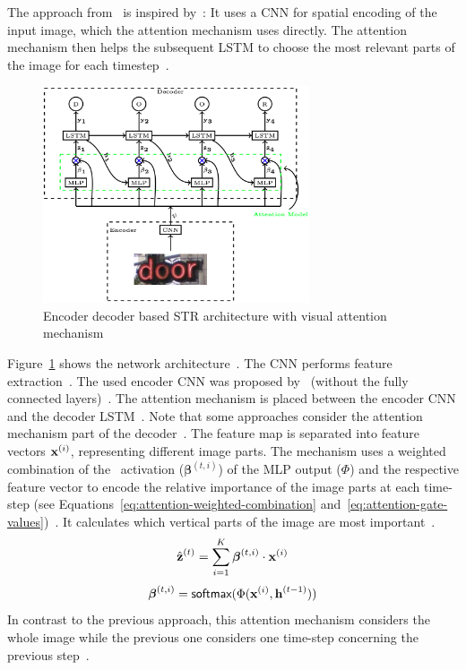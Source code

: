 The approach from~\cite{ghosh_visual_2017} is inspired by~\cite{bahdanau_neural_2016,xu_show_2016}:
It uses a \ac{CNN} for spatial encoding of the input image, which the attention mechanism uses
directly.
The attention mechanism then helps the subsequent \ac{LSTM} to choose the most relevant parts of the
image for each timestep~\citep{ghosh_visual_2017}.
\begin{figure}[h]
    \centering
    \includegraphics[width=0.7\textwidth]{img/STR-encdec-attention-Gosh-Visual-2017.png}
    \caption[Encoder decoder \& visual attention based STR architecture]{%
        Encoder decoder based STR architecture with visual attention
        mechanism~\citep{ghosh_visual_2017}\label{fig:STR-attention}
    }
\end{figure}
Figure~\ref{fig:STR-attention} shows the network architecture~\citep{ghosh_visual_2017}.
The \ac{CNN} performs feature extraction~\citep{ghosh_visual_2017}.
The used encoder \ac{CNN} was proposed by~\cite{jaderberg_reading_2014} (without the fully connected
layers)~\citep{ghosh_visual_2017}.
The attention mechanism is placed between the encoder \ac{CNN} and the decoder
\ac{LSTM}~\citep{ghosh_visual_2017}.
Note that some approaches consider the attention mechanism part of the
decoder~\citep{shi_aster_2019,shi_robust_2016}.
The feature map is separated into feature vectors $\textbf{x}^{(i)}$, representing different image parts.
The mechanism uses a weighted combination of the \sfmx\ activation ($\boldsymbol{\beta}^{(t,i)}$) of
the \ac{MLP} output ($\Phi$) and the respective feature vector to encode the relative importance of
the image parts at each time-step (see Equations~\ref{eq:attention-weighted-combination}
and~\ref{eq:attention-gate-values})~\citep{ghosh_visual_2017,xu_show_2016}.
It calculates which vertical parts of the image are most important~\citep{ghosh_visual_2017}.
\begin{equation}\label{eq:attention-weighted-combination}
    \hat{\textbf{z}}^{(t)}=\sum_{i=1}^{K}\boldsymbol{\beta}^{(t,i)}\cdot \textbf{x}^{(i)}
\end{equation}
\begin{equation}\label{eq:attention-gate-values}
    \boldsymbol{\beta}^{(t,i)}=\textsf{softmax}(\Phi(\textbf{x}^{(i)},\textbf{h}^{(t-1)}))
\end{equation}
In contrast to the previous approach, this attention mechanism considers the whole image while the
previous one considers one time-step concerning the previous
step~\citep{shi_robust_2016,ghosh_visual_2017}.

